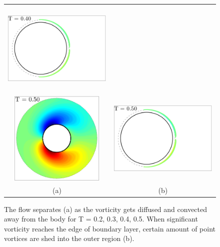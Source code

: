 \begin{figure}
\begin{center}
\begin{tabular}{cc}
 \includegraphics[height=4.5cm]{./Figures/results/static/vortices_T0_40.pdf}  \\
 \includegraphics[height=4.5cm]{./Figures/results/static/vorticity_T0_50.pdf} &
 \includegraphics[height=4.5cm]{./Figures/results/static/vortices_T0_50.pdf}  \\
 (a) & (b)
\end{tabular}
\end{center}
 \caption[Flow separation shown by vorticity development]{The flow separates (a) as the vorticity gets diffused and convected away from the body for T = 0.2, 0.3, 0.4, 0.5. When significant vorticity reaches the edge of boundary layer, certain amount of point vortices are shed into the outer region (b). }
 \label{fig:Separation1}
\end{figure}

